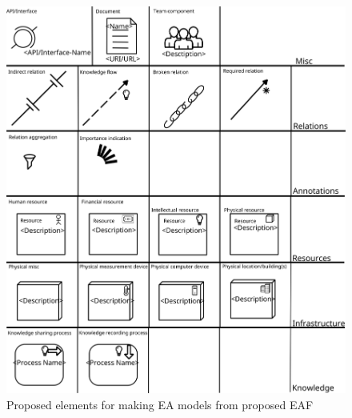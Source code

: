 \begin{figure}
    \centering
    \includegraphics[scale=0.6]{figures/png/elements.png}
    \caption{Proposed elements for making EA models from proposed EAF }
    \label{fig:4-architecture-elements}
\end{figure}
